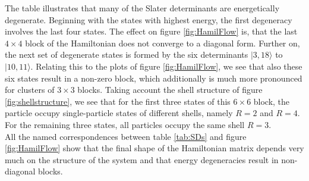 The table illustrates that many of the Slater determinants are energetically degenerate. Beginning with the states with highest energy, the first degeneracy involves the last four states. The effect on figure \ref{fig:HamilFlow} is, that the last $4\times 4$ block of the Hamiltonian does not converge to a diagonal form. Further on, the next set of degenerate states is formed by the six determinants $|3,18\rangle$ to $|10,11\rangle$. Relating this to the plots of figure \ref{fig:HamilFlow}, we see that also these six states result in a non-zero block, which additionally is much more pronounced for clusters of $3 \times 3$ blocks. Taking account the shell structure of figure \ref{fig:shellstructure}, we see that for the first three states of this $6 \times 6$ block, the particle occupy single-particle states of different shells, namely $R = 2$ and $R=4$. For the remaining three states, all particles occupy the same shell $R = 3$. \\
All the named correspondences between table \ref{tab:SDs} and figure \ref{fig:HamilFlow} show that the final shape of the Hamiltonian matrix depends very much on the structure of the system and that energy degeneracies result in non-diagonal blocks. 

